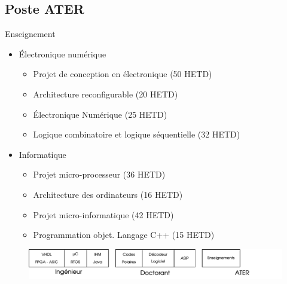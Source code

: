 \documentclass[t,compress,mathserif,12pt,xcolor=dvipsnames]{beamer}
\begin{document}
\subsection{Poste ATER}
\begin{frame}[t]{Enseignement}
  \begin{minipage}[t][5.0cm][t]{\textwidth}
    \vspace{-0.5cm}
    \begin{itemize}
      \item<+-> \'Electronique numérique
      \begin{itemize}
        \item<1-> Projet de conception en \'electronique (50 HETD)
        \item<1-> Architecture reconfigurable (20 HETD)
        \item<1-> \'Electronique Num\'erique (25 HETD)
        \item<1-> Logique combinatoire et logique s\'equentielle (32 HETD)
      \end{itemize}
      \vspace{0.3cm}
      \item<+-> Informatique
      \begin{itemize}
        \item<2-> Projet micro-processeur (36 HETD)
        \item<2-> Architecture des ordinateurs (16 HETD)
        \item<2-> Projet micro-informatique (42 HETD)
        \item<2-> Programmation objet. Langage C++ (15 HETD)
      \end{itemize}
    \end{itemize}

  \end{minipage}
  \begin{figure}[htp]
    \centering
    \includegraphics[width=\textwidth]{fig/frise8}
  \end{figure}
\end{frame}
\end{document}
